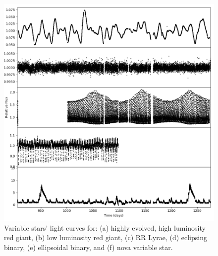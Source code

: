 \begin{figure}[p]
    \centering
    \includegraphics[width=\linewidth]{Chapter1/lightcurves.png}
    \caption[Light curves of variable stars]{Variable stars' light curves for: (a) highly evolved, high luminosity red giant, (b) low luminosity red giant, (c) RR Lyrae, (d) eclipsing binary, (e) ellipsoidal binary, and (f) nova variable star.}
    \label{fig:lightcurve_examples}
\end{figure}

